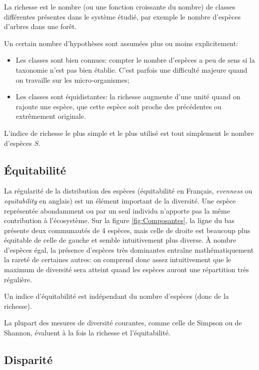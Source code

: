 \documentclass[
  11pt,
  american,
  a4paper,
  extrafontsizes,onecolumn,openright
  ]{memoir}
\providecommand{\tightlist}{%
  \setlength{\itemsep}{0pt}\setlength{\parskip}{0pt}}
\newlength{\rf}
\begin{document}
La richesse \autocite[terme introduit par][]{Mcintosh1967} est le nombre (ou une fonction croissante du nombre) de classes différentes présentes dans le système étudié, par exemple le nombre d'espèces d'arbres dans une forêt.

Un certain nombre d'hypothèses sont assumées plus ou moins explicitement:

\begin{itemize}
\tightlist
\item
  Les classes sont bien connues: compter le nombre d'espèces a peu de sens si la taxonomie n'est pas bien établie.
  C'est parfois une difficulté majeure quand on travaille sur les micro-organismes;
\item
  Les classes sont équidistantes: la richesse augmente d'une unité quand on rajoute une espèce, que cette espèce soit proche des précédentes ou extrêmement originale.
\end{itemize}

L'indice de richesse le plus simple et le plus utilisé est tout simplement le nombre d'espèces \(S\).

\hypertarget{uxe9quitabilituxe9}{%
\subsection{Équitabilité}\label{uxe9quitabilituxe9}}

La régularité de la distribution des espèces (équitabilité en Français, \emph{evenness} ou \emph{equitability} en anglais) est un élément important de la diversité.
Une espèce représentée abondamment ou par un seul individu n'apporte pas la même contribution à l'écosystème.
Sur la figure \ref{fig:Composantes}, la ligne du bas présente deux communautés de 4 espèces, mais celle de droite est beaucoup plus équitable de celle de gauche et semble intuitivement plus diverse.
À nombre d'espèces égal, la présence d'espèces très dominantes entraîne mathématiquement la rareté de certaines autres: on comprend donc assez intuitivement que le maximum de diversité sera atteint quand les espèces auront une répartition très régulière.

Un indice d'équitabilité est indépendant du nombre d'espèces (donc de la richesse).

La plupart des mesures de diversité courantes, comme celle de Simpson ou de Shannon, évaluent à la fois la richesse et l'équitabilité.

\hypertarget{disparituxe9}{%
\subsection{Disparité}\label{disparituxe9}}
\end{document}
